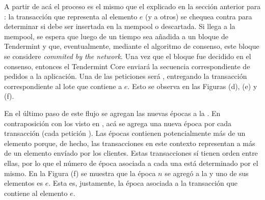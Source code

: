 %

A partir de acá el proceso es el mismo que el explicado en la sección anterior para \vanilla: la transacción
que representa al elemento $e$ (y a otros) se chequea contra \CheckTx para determinar si debe ser insertada
en la mempool o descartada.
%
Si llega a la mempool, se espera que luego de un tiempo sea añadida a un bloque de Tendermint y que, eventualmente,
mediante el algoritmo de consenso, este bloque se considere \textit{commited by the network}.
%
Una vez que el bloque fue decidido en el consenso, entonces el Tendermint Core enviará
la secuencia correspondiente de pedidos a la aplicación.
%
Una de las peticiones será \DeliverTx, entregando la transacción correspondiente al lote que contiene a $e$.
%
Esto se observa en las Figuras (d), (e) y (f).

%
En el último paso de este flujo se agregan las nuevas épocas a la \setchain.
En contraposición con los visto en \vanilla, acá se agrega una nueva época por cada transacción (cada petición \DeliverTx).
Las épocas contienen potencialmente más de un elemento porque, de hecho, las transacciones en este contexto representan a más de un elemento
envíado por los clientes.
Estas transacciones sí tienen orden entre ellas, por lo que el número de época asociada a cada una está determinado por el mismo.
En la Figura (f) se muestra que la época $n$ se agregó a la \setchain y uno de sus elementos es $e$. Esta es, justamente, la época asociada
a la transacción que contiene al elemento $e$.


